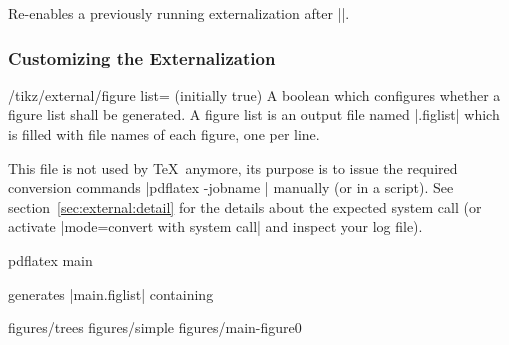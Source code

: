 {\begin{command}{\tikzexternalenable}
    Re-enables a previously running externalization after |\tikzexternaldisable|.
\end{command}


\subsubsection{Customizing the Externalization}

\begin{key}{/tikz/external/figure list= (initially true)}
    A boolean which configures whether a figure list shall be generated. A
    figure list is an output file named |.figlist| which is
    filled with file names of each figure, one per line.

    This file is not used by \TeX\ anymore, its purpose is to issue the
    required conversion commands |pdflatex -jobname |
     manually (or in a script). See
    section~\ref{sec:external:detail} for the details about the expected system
    call (or activate |mode=convert with system call| and inspect your log
    file).

\begin{codeexample}[code only, tikz syntax=false]
pdflatex main
\end{codeexample}
    generates |main.figlist| containing
\begin{codeexample}[code only, tikz syntax=false]
figures/trees
figures/simple
figures/main-figure0
\end{codeexample}
\end{key}

}
